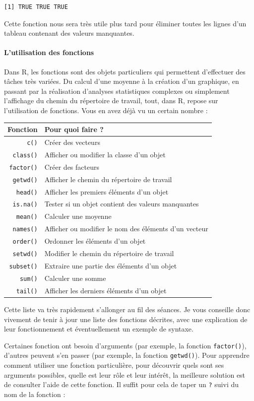 \documentclass[a4paperpaper,]{article}
\let\oldparagraph\paragraph
\renewcommand{\paragraph}[1]{\oldparagraph{#1}\mbox{}}
\theoremstyle{definition}
\theoremstyle{definition}
\theoremstyle{definition}
\theoremstyle{remark}
\begin{document}
\begin{verbatim}
[1] TRUE TRUE TRUE
\end{verbatim}

Cette fonction nous sera très utile plus tard pour éliminer toutes les
lignes d'un tableau contenant des valeurs manquantes.

\paragraph{L'utilisation des fonctions}\label{functions}

Dans R, les fonctions sont des objets particuliers qui permettent
d'effectuer des tâches très variées. Du calcul d'une moyenne à la
création d'un graphique, en passant par la réalisation d'analyses
statistiques complexes ou simplement l'affichage du chemin du répertoire
de travail, tout, dans R, repose sur l'utilisation de fonctions. Vous en
avez déjà vu un certain nombre :

\begin{longtable}[]{@{}rl@{}}
\toprule
Fonction & Pour quoi faire ?\tabularnewline
\midrule
\endhead
\texttt{c()} & Créer des vecteurs\tabularnewline
\texttt{class()} & Afficher ou modifier la classe d'un
objet\tabularnewline
\texttt{factor()} & Créer des facteurs\tabularnewline
\texttt{getwd()} & Afficher le chemin du répertoire de
travail\tabularnewline
\texttt{head()} & Afficher les premiers éléments d'un
objet\tabularnewline
\texttt{is.na()} & Tester si un objet contient des valeurs
manquantes\tabularnewline
\texttt{mean()} & Calculer une moyenne\tabularnewline
\texttt{names()} & Afficher ou modifier le nom des éléments d'un
vecteur\tabularnewline
\texttt{order()} & Ordonner les éléments d'un objet\tabularnewline
\texttt{setwd()} & Modifier le chemin du répertoire de
travail\tabularnewline
\texttt{subset()} & Extraire une partie des éléments d'un
objet\tabularnewline
\texttt{sum()} & Calculer une somme\tabularnewline
\texttt{tail()} & Afficher les derniers éléments d'un
objet\tabularnewline
\bottomrule
\end{longtable}

Cette liste va très rapidement s'allonger au fil des séances. Je vous
conseille donc vivement de tenir à jour une liste des fonctions
décrites, avec une explication de leur fonctionnement et éventuellement
un exemple de syntaxe.

Certaines fonction ont besoin d'arguments (par exemple, la fonction
\texttt{factor()}), d'autres peuvent s'en passer (par exemple, la
fonction \texttt{getwd()}). Pour apprendre comment utiliser une fonction
particulière, pour découvrir quels sont ses arguments possibles, quelle
est leur rôle et leur intérêt, la meilleure solution est de consulter
l'aide de cette fonction. Il suffit pour cela de taper un \texttt{?}
suivi du nom de la fonction :
\end{document}
